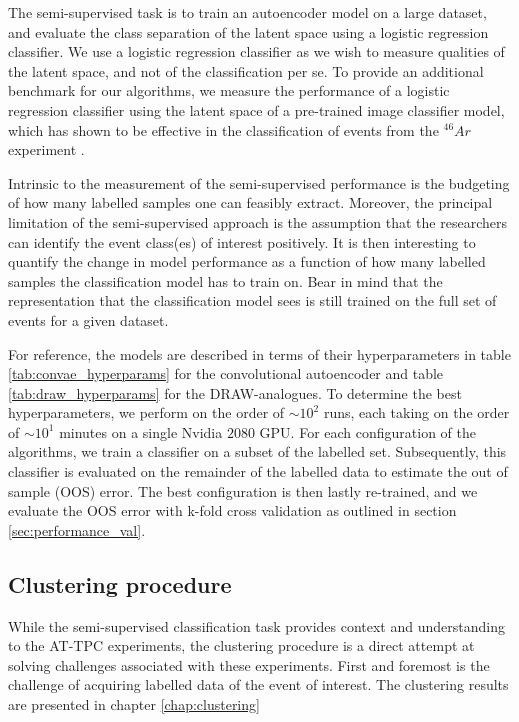 The semi-supervised task is to train an autoencoder model on a large dataset, and evaluate the class separation of the latent space using a logistic regression classifier. We use a logistic regression classifier as we wish to measure qualities of the latent space, and not of the classification per se. To provide an additional benchmark for our algorithms, we measure the performance of a logistic regression classifier using the latent space of a pre-trained image classifier model, which has shown to be effective in the classification of events from the ${}^{46}Ar$ experiment \cite{Kuchera2019}.

Intrinsic to the measurement of the semi-supervised performance is the budgeting of how many labelled samples one can feasibly extract. Moreover, the principal limitation of the semi-supervised approach is the assumption that the researchers can identify the event class(es) of interest positively. It is then interesting to quantify the change in model performance as a function of how many labelled samples the classification model has to train on. Bear in mind that the representation that the classification model sees is still trained on the full set of events for a given dataset. 

For reference, the models are described in terms of their hyperparameters in table \ref{tab:convae_hyperparams} for the convolutional autoencoder and table \ref{tab:draw_hyperparams} for the DRAW-analogues. To determine the best hyperparameters, we perform on the order of $\sim 10^2$ runs, each taking on the order of $\sim 10^1$ minutes on a single Nvidia $2080$ GPU. For each configuration of the algorithms, we train a classifier on a subset of the labelled set. Subsequently, this classifier is evaluated on the remainder of the labelled data to estimate the out of sample (OOS) error. The best configuration is then lastly re-trained, and we evaluate the OOS error with k-fold cross validation as outlined in section \ref{sec:performance_val}.

\subsection{Clustering procedure}

While the semi-supervised classification task provides context and understanding to the AT-TPC experiments, the clustering procedure is a direct attempt at solving challenges associated with these experiments. First and foremost is the challenge of acquiring labelled data of the event of interest. The clustering results are presented in chapter \ref{chap:clustering} 

